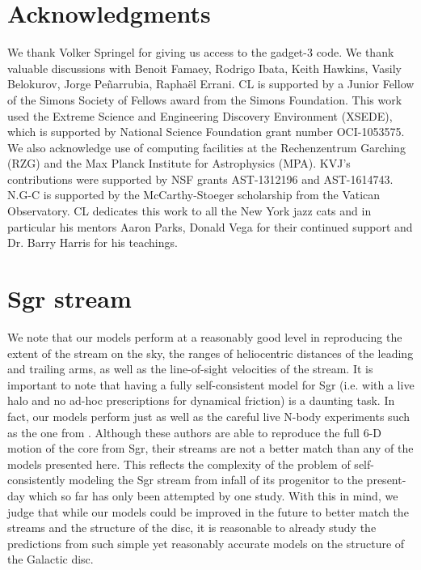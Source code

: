 \documentclass[useAMS,usenatbib]{mnras}
\begin{document}
{\section*{Acknowledgments}
We thank Volker Springel for giving us access to the {\sc gadget-3} code. We thank valuable discussions with Benoit Famaey, Rodrigo Ibata, Keith Hawkins, Vasily Belokurov, Jorge Pe\~narrubia, Rapha\"el Errani. CL is supported by a Junior Fellow of the Simons Society of Fellows award from the Simons Foundation. This work used the Extreme Science and Engineering Discovery Environment (XSEDE), which is supported by National Science Foundation grant number OCI-1053575. We also acknowledge use of computing facilities at the Rechenzentrum Garching (RZG) and the Max Planck Institute for Astrophysics (MPA). KVJ's contributions were supported by NSF grants AST-1312196 and AST-1614743. N.G-C is supported by the McCarthy-Stoeger scholarship from the Vatican Observatory. CL dedicates this work to all the New York jazz cats and in particular his mentors Aaron Parks, Donald Vega for their continued support and Dr. Barry Harris for his teachings. 

{}

\appendix

\section{Sgr stream}
We note that our models perform at a reasonably good level in reproducing the extent of the stream on the sky, the ranges of heliocentric distances of the leading and trailing arms, as well as the line-of-sight velocities of the stream. It is important to note that having a fully self-consistent model for Sgr (i.e. with a live halo and no ad-hoc prescriptions for dynamical friction) is a daunting task. In fact, our models perform just as well as the careful live N-body experiments such as the one from \citep{dierickx17}. Although these authors are able to reproduce the full 6-D motion of the core from Sgr, their streams are not a better match than any of the models presented here. This reflects the complexity of the problem of self-consistently modeling the Sgr stream from infall of its progenitor to the present-day which so far has only been attempted by one study. With this in mind, we judge that while our models could be improved in the future to better match the streams and the structure of the disc, it is reasonable to already study the predictions from such simple yet reasonably accurate models on the structure of the Galactic disc.

}
\end{document}
